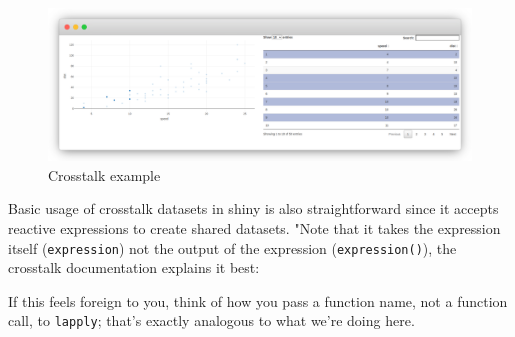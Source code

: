 \documentclass[
]{krantz}
\makeatletter
\newenvironment{Shaded}{\begin{snugshade}}{\end{snugshade}}
\newcommand{\DataTypeTok}[1]{\textcolor[rgb]{0.27,0.27,0.27}{#1}}
\newcommand{\KeywordTok}[1]{\textcolor[rgb]{0.27,0.27,0.27}{\textbf{#1}}}
\newcommand{\NormalTok}[1]{#1}
\newcommand{\OperatorTok}[1]{\textcolor[rgb]{0.43,0.43,0.43}{\textbf{#1}}}
\newcommand{\StringTok}[1]{\textcolor[rgb]{0.5,0.5,0.5}{#1}}
\renewenvironment{quote}{\begin{VF}}{\end{VF}}
\newenvironment{kframe}{%
\medskip{}
\setlength{\fboxsep}{.8em}
 \def\at@end@of@kframe{}%
 \ifinner\ifhmode%
  \def\at@end@of@kframe{\end{minipage}}%
  \begin{minipage}{\columnwidth}%
 \fi\fi%
 \def\FrameCommand##1{\hskip\@totalleftmargin \hskip-\fboxsep
 \colorbox{shadecolor}{##1}\hskip-\fboxsep
     \hskip-\linewidth \hskip-\@totalleftmargin \hskip\columnwidth}%
 \MakeFramed {\advance\hsize-\width
   \@totalleftmargin\z@ \linewidth\hsize
   \@setminipage}}%
 {\par\unskip\endMakeFramed%
 \at@end@of@kframe}
\renewenvironment{Shaded}{\begin{kframe}}{\end{kframe}}
\makeatother
\begin{document}
\begin{Shaded}
\end{Shaded}

\begin{figure}[t]

{\centering \includegraphics[width=1\linewidth]{images/crosstalk} 

}

\caption{Crosstalk example}\label{fig:crosstalk-1}
\end{figure}

Basic usage of crosstalk datasets in shiny is also straightforward since it accepts reactive expressions to create shared datasets. "Note that it takes the expression itself (\texttt{expression}) not the output of the expression (\texttt{expression()}), the crosstalk documentation explains it best:

\begin{quote}
If this feels foreign to you, think of how you pass a function name, not a function call, to \texttt{lapply}; that's exactly analogous to what we're doing here.

\end{quote}
\end{document}
